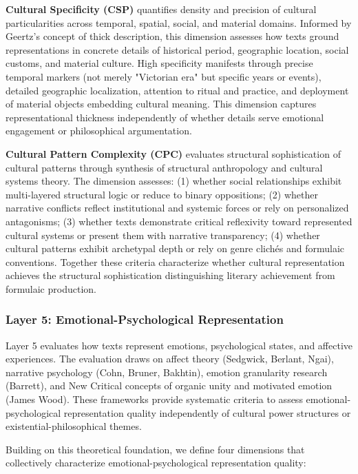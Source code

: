 \textbf{Cultural Specificity (CSP)} quantifies density and precision of cultural particularities across temporal, spatial, social, and material domains. Informed by Geertz's concept of thick description, this dimension assesses how texts ground representations in concrete details of historical period, geographic location, social customs, and material culture. High specificity manifests through precise temporal markers (not merely "Victorian era" but specific years or events), detailed geographic localization, attention to ritual and practice, and deployment of material objects embedding cultural meaning. This dimension captures representational thickness independently of whether details serve emotional engagement or philosophical argumentation.

\textbf{Cultural Pattern Complexity (CPC)} evaluates structural sophistication of cultural patterns through synthesis of structural anthropology and cultural systems theory. The dimension assesses: (1) whether social relationships exhibit multi-layered structural logic or reduce to binary oppositions; (2) whether narrative conflicts reflect institutional and systemic forces or rely on personalized antagonisms; (3) whether texts demonstrate critical reflexivity toward represented cultural systems or present them with narrative transparency; (4) whether cultural patterns exhibit archetypal depth or rely on genre clichés and formulaic conventions. Together these criteria characterize whether cultural representation achieves the structural sophistication distinguishing literary achievement from formulaic production.

\subsubsection{Layer 5: Emotional-Psychological Representation}

Layer 5 evaluates how texts represent emotions, psychological states, and affective experiences. The evaluation draws on affect theory (Sedgwick, Berlant, Ngai), narrative psychology (Cohn, Bruner, Bakhtin), emotion granularity research (Barrett), and New Critical concepts of organic unity and motivated emotion (James Wood). These frameworks provide systematic criteria to assess emotional-psychological representation quality independently of cultural power structures or existential-philosophical themes.

Building on this theoretical foundation, we define four dimensions that collectively characterize emotional-psychological representation quality:

